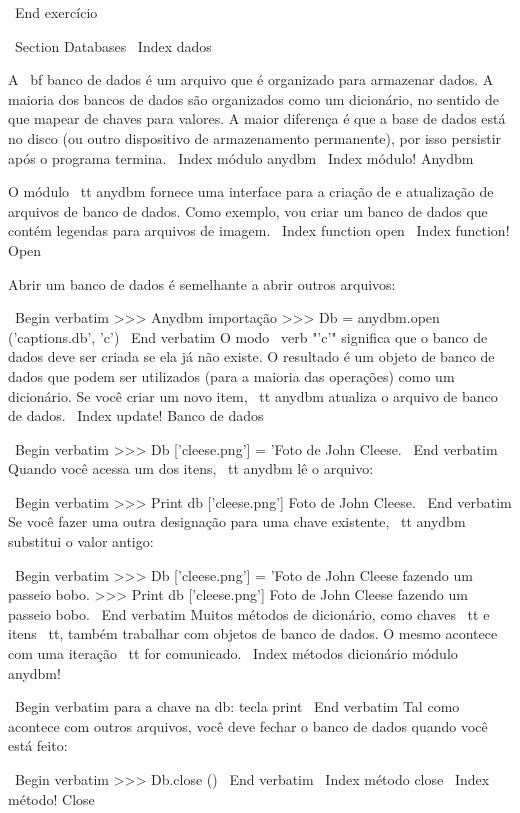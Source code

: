 \documentclass[10pt]{book}
\begin{document}
\begin {itemize}
{{{{{{{{{{\ End {} exercício


\ Section {} Databases
\ Index {dados}

A {\ bf banco de dados} é um arquivo que é organizado para armazenar dados.
A maioria dos bancos de dados são organizados como um dicionário, no sentido de
que mapear de chaves para valores. A maior diferença
é que a base de dados está no disco (ou outro dispositivo de armazenamento permanente),
por isso persistir após o programa termina.
\ Index {módulo anydbm}
\ Index {módulo! Anydbm}

O módulo {\ tt anydbm} fornece uma interface para a criação de
e atualização de arquivos de banco de dados. Como exemplo, vou criar um banco de dados
que contém legendas para arquivos de imagem.
\ Index {function open}
\ Index {function! Open}

Abrir um banco de dados é semelhante a abrir outros arquivos:

\ Begin {verbatim}
>>> Anydbm importação
>>> Db = anydbm.open ('captions.db', 'c')
\ End {verbatim}
%
O modo \ verb "'c'" significa que o banco de dados deve ser criada se
ela já não existe. O resultado é um objeto de banco de dados
que podem ser utilizados (para a maioria das operações) como um dicionário.
Se você criar um novo item, {\ tt anydbm} atualiza o arquivo de banco de dados.
\ Index {update! Banco de dados}


\ Begin {verbatim}
>>> Db ['cleese.png'] = 'Foto de John Cleese.
\ End {verbatim}
%
Quando você acessa um dos itens, {\ tt anydbm} lê o arquivo:

\ Begin {verbatim}
>>> Print db ['cleese.png']
Foto de John Cleese.
\ End {verbatim}
%
Se você fazer uma outra designação para uma chave existente, {\ tt anydbm} substitui
o valor antigo:

\ Begin {verbatim}
>>> Db ['cleese.png'] = 'Foto de John Cleese fazendo um passeio bobo.
>>> Print db ['cleese.png']
Foto de John Cleese fazendo um passeio bobo.
\ End {verbatim}
%
Muitos métodos de dicionário, como chaves {\ tt} e {itens \ tt}, também
trabalhar com objetos de banco de dados. O mesmo acontece com uma iteração {\ tt for}
comunicado.
\ Index {métodos dicionário módulo anydbm!}

\ Begin {verbatim}
para a chave na db:
    tecla print
\ End {verbatim}
%
Tal como acontece com outros arquivos, você deve fechar o banco de dados quando você está
feito:

\ Begin {verbatim}
>>> Db.close ()
\ End {verbatim}
%
\ Index {método close}
\ Index {método! Close}


}}}}}}}}}}
\end{itemize}
\end{document}
